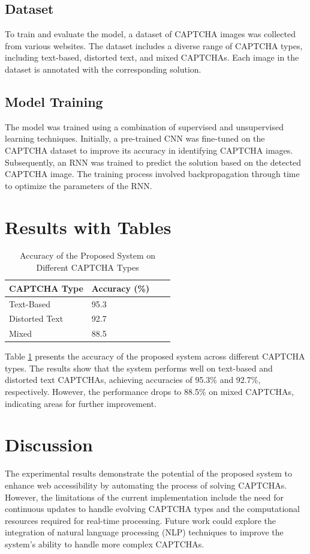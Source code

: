 \documentclass{article}
\begin{document}
\subsection{Dataset}
To train and evaluate the model, a dataset of CAPTCHA images was collected from various websites. The dataset includes a diverse range of CAPTCHA types, including text-based, distorted text, and mixed CAPTCHAs. Each image in the dataset is annotated with the corresponding solution.

\subsection{Model Training}
The model was trained using a combination of supervised and unsupervised learning techniques. Initially, a pre-trained CNN was fine-tuned on the CAPTCHA dataset to improve its accuracy in identifying CAPTCHA images. Subsequently, an RNN was trained to predict the solution based on the detected CAPTCHA image. The training process involved backpropagation through time to optimize the parameters of the RNN.

\section{Results with Tables}
\begin{table}[ht]
\centering
\caption{Accuracy of the Proposed System on Different CAPTCHA Types}
\begin{tabular}{@{}llll@{}}
\toprule
\textbf{CAPTCHA Type} & \textbf{Accuracy (\%)} \\
\midrule
Text-Based & 95.3 \\
Distorted Text & 92.7 \\
Mixed & 88.5 \\
\bottomrule
\end{tabular}
\label{tab:results}
\end{table}

Table \ref{tab:results} presents the accuracy of the proposed system across different CAPTCHA types. The results show that the system performs well on text-based and distorted text CAPTCHAs, achieving accuracies of 95.3\% and 92.7\%, respectively. However, the performance drops to 88.5\% on mixed CAPTCHAs, indicating areas for further improvement.

\section{Discussion}
The experimental results demonstrate the potential of the proposed system to enhance web accessibility by automating the process of solving CAPTCHAs. However, the limitations of the current implementation include the need for continuous updates to handle evolving CAPTCHA types and the computational resources required for real-time processing. Future work could explore the integration of natural language processing (NLP) techniques to improve the system's ability to handle more complex CAPTCHAs.
\end{document}
